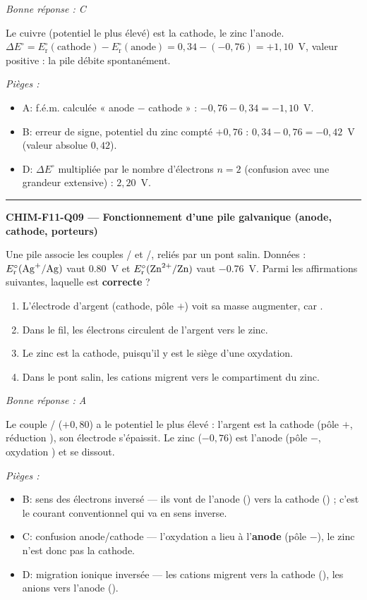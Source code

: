 \documentclass[11pt,a4paper]{article}
\begin{document}
\textit{Bonne réponse : C}\par
Le cuivre (potentiel le plus élevé) est la cathode, le zinc l'anode. $\Delta E^\circ=E^\circ_{\mathrm{r}}(\text{cathode})-E^\circ_{\mathrm{r}}(\text{anode})=0{,}34-(-0{,}76)=+1{,}10$~V, valeur positive : la pile débite spontanément.\par
\textit{Pièges :}
\begin{itemize}
\item A: f.é.m. calculée « anode $-$ cathode » : $-0{,}76-0{,}34=-1{,}10$~V.
\item B: erreur de signe, potentiel du zinc compté $+0{,}76$ : $0{,}34-0{,}76=-0{,}42$~V (valeur absolue $0{,}42$).
\item D: $\Delta E^\circ$ multipliée par le nombre d'électrons $n=2$ (confusion avec une grandeur extensive) : $2{,}20$~V.
\end{itemize}
\vspace{8pt}\hrule\vspace{8pt}
\noindent\textbf{CHIM-F11-Q09 --- Fonctionnement d'une pile galvanique (anode, cathode, porteurs)}\par
Une pile associe les couples / et /, reliés par un pont salin. Données : $E^\circ_{\mathrm{r}}(\ce{Ag+}/\ce{Ag})$ vaut \qty{+0.80}{\volt} et $E^\circ_{\mathrm{r}}(\ce{Zn^{2+}}/\ce{Zn})$ vaut \qty{-0.76}{\volt}. Parmi les affirmations suivantes, laquelle est \textbf{correcte} ?
\begin{enumerate}[label=\Alph*)]
\item L'électrode d'argent (cathode, pôle $+$) voit sa masse augmenter, car .
\item Dans le fil, les électrons circulent de l'argent vers le zinc.
\item Le zinc est la cathode, puisqu'il y est le siège d'une oxydation.
\item Dans le pont salin, les cations migrent vers le compartiment du zinc.
\end{enumerate}
\textit{Bonne réponse : A}\par
Le couple / ($+0{,}80$) a le potentiel le plus élevé : l'argent est la cathode (pôle $+$, réduction ), son électrode s'épaissit. Le zinc ($-0{,}76$) est l'anode (pôle $-$, oxydation ) et se dissout.\par
\textit{Pièges :}
\begin{itemize}
\item B: sens des électrons inversé — ils vont de l'anode () vers la cathode () ; c'est le courant conventionnel qui va en sens inverse.
\item C: confusion anode/cathode — l'oxydation a lieu à l'\textbf{anode} (pôle $-$), le zinc n'est donc pas la cathode.
\item D: migration ionique inversée — les cations migrent vers la cathode (), les anions vers l'anode ().
\end{itemize}
\end{document}
